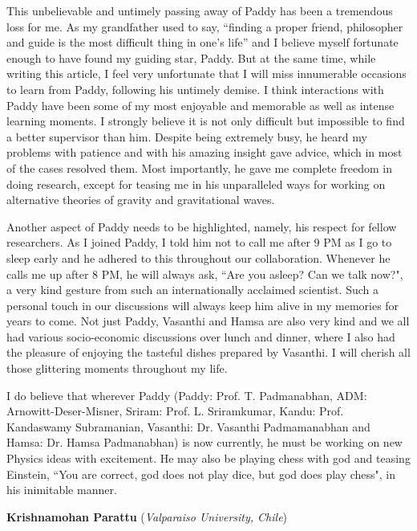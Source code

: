 \documentclass[prd, preprint, longbibliography, 12pt]{revtex4-2}
\begin{document}
This unbelievable and untimely passing away of Paddy has been a tremendous loss for me. As my grandfather used to say, ``finding a proper friend, philosopher and guide is the most difficult thing in one's life'' and I believe myself fortunate enough to have found my guiding star, Paddy. But at the same time, while writing this article, I feel very unfortunate that I will miss innumerable occasions to learn from Paddy, following his untimely demise. I think interactions with Paddy have been some of my most enjoyable and memorable as well as intense learning moments. I strongly believe it is not only difficult but impossible to find a better supervisor than him. Despite being extremely busy, he heard my problems with patience and with his amazing insight gave advice, which in most of the cases resolved them. Most importantly, he gave me complete freedom in doing research, except for teasing me in his unparalleled ways for working on alternative theories of gravity and gravitational waves. 

Another aspect of Paddy needs to be highlighted, namely, his respect for fellow researchers. As I joined Paddy, I told him not to call me after 9 PM as I go to sleep early and he adhered to this throughout our collaboration. Whenever he calls me up after 8 PM, he will always ask, ``Are you asleep? Can we talk now?", a very kind gesture from such an internationally acclaimed scientist. Such a personal touch in our discussions will always keep him alive in my memories for years to come. Not just Paddy, Vasanthi and Hamsa are also very kind and we all had various socio-economic discussions over lunch and dinner, where I also had the pleasure of enjoying the tasteful dishes prepared by Vasanthi. I will cherish all those glittering moments throughout my life. 

I do believe that wherever Paddy (Paddy: Prof. T. Padmanabhan, ADM: Arnowitt-Deser-Misner, Sriram: Prof. L. Sriramkumar, Kandu: Prof. Kandaswamy Subramanian, Vasanthi: Dr. Vasanthi Padmamanabhan and Hamsa: Dr. Hamsa Padmanabhan) is now currently, he must be working on new Physics ideas with excitement. He may also be playing chess with god and teasing Einstein, ``You are correct, god does not play dice, but god does play chess", in his inimitable manner.   

\bigskip

\bigskip



\centerline{{\bf Krishnamohan Parattu}  ({\it Valparaiso University, Chile}) }
\end{document}
